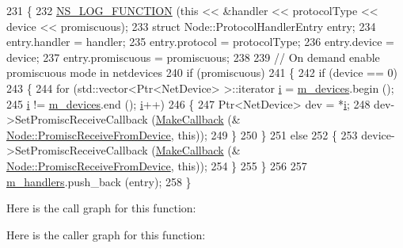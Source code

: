 \begin{DoxyCode}
231 \{
232   \hyperlink{log-macros-disabled_8h_a90b90d5bad1f39cb1b64923ea94c0761}{NS\_LOG\_FUNCTION} (\textcolor{keyword}{this} << &handler << protocolType << device << promiscuous);
233   \textcolor{keyword}{struct }Node::ProtocolHandlerEntry entry;
234   entry.handler = handler;
235   entry.protocol = protocolType;
236   entry.device = device;
237   entry.promiscuous = promiscuous;
238 
239   \textcolor{comment}{// On demand enable promiscuous mode in netdevices}
240   \textcolor{keywordflow}{if} (promiscuous)
241     \{
242       \textcolor{keywordflow}{if} (device == 0)
243         \{
244           \textcolor{keywordflow}{for} (std::vector<Ptr<NetDevice> >::iterator \hyperlink{bernuolliDistribution_8m_a6f6ccfcf58b31cb6412107d9d5281426}{i} = \hyperlink{classns3_1_1Node_af0ba0670e62825e6953317a7a028aa40}{m\_devices}.begin ();
245                \hyperlink{bernuolliDistribution_8m_a6f6ccfcf58b31cb6412107d9d5281426}{i} != \hyperlink{classns3_1_1Node_af0ba0670e62825e6953317a7a028aa40}{m\_devices}.end (); \hyperlink{bernuolliDistribution_8m_a6f6ccfcf58b31cb6412107d9d5281426}{i}++)
246             \{
247               Ptr<NetDevice> dev = *\hyperlink{bernuolliDistribution_8m_a6f6ccfcf58b31cb6412107d9d5281426}{i};
248               dev->SetPromiscReceiveCallback (\hyperlink{group__makecallbackmemptr_ga9376283685aa99d204048d6a4b7610a4}{MakeCallback} (&
      \hyperlink{classns3_1_1Node_a16cf271eeeab87dc7133ffb3f8b24dc4}{Node::PromiscReceiveFromDevice}, \textcolor{keyword}{this}));
249             \}
250         \}
251       \textcolor{keywordflow}{else}
252         \{
253           device->SetPromiscReceiveCallback (\hyperlink{group__makecallbackmemptr_ga9376283685aa99d204048d6a4b7610a4}{MakeCallback} (&
      \hyperlink{classns3_1_1Node_a16cf271eeeab87dc7133ffb3f8b24dc4}{Node::PromiscReceiveFromDevice}, \textcolor{keyword}{this}));
254         \}
255     \}
256 
257   \hyperlink{classns3_1_1Node_ab83de89d6f361c6fbb3a92f03523b8d0}{m\_handlers}.push\_back (entry);
258 \}
\end{DoxyCode}


Here is the call graph for this function\+:




Here is the caller graph for this function\+:


